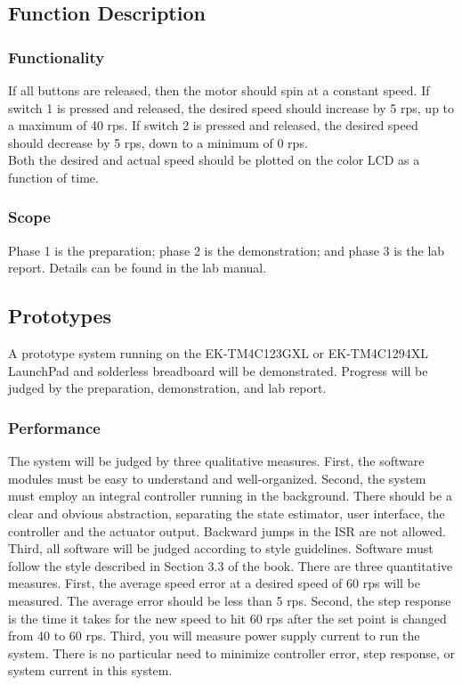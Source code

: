 \documentclass{article}
\begin{document}
	\subsection{Function Description}
	
		\subsubsection{Functionality}
			If all buttons are released, then the motor should spin at a constant speed. If switch 1 is pressed and released, the desired speed should increase by 5 rps, up to a maximum of 40 rps. If switch 2 is pressed and released, the desired speed should decrease by 5 rps, down to a minimum of 0 rps.\\
			Both the desired and actual speed should be plotted on the color LCD as a function of time.
		\subsubsection{Scope}
			Phase 1 is the preparation; phase 2 is the demonstration; and phase 3 is the lab report. Details can be found in the lab manual.
		\subsection{Prototypes}
			A prototype system running on the EK-TM4C123GXL or EK-TM4C1294XL LaunchPad and solderless breadboard will be demonstrated. Progress will be judged by the preparation, demonstration, and lab report.
		\subsubsection{Performance}
			The system will be judged by three qualitative measures. First, the software modules must be easy to understand and well-organized. Second, the system must employ an integral controller running in the background. There should be a clear and obvious abstraction, separating the state estimator, user interface, the controller and the actuator output. Backward jumps in the ISR are not allowed. Third, all software will be judged according to style guidelines. Software must follow the style described in Section 3.3 of the book. There are three quantitative measures. First, the average speed error at a desired speed of 60 rps will be measured. The average error should be less than 5 rps. Second, the step response is the time it takes for the new speed to hit 60 rps after the set point is changed from 40 to 60 rps. Third, you will measure power supply current to run the system. There is no particular need to minimize controller error, step response, or system current in this system.
\end{document}
